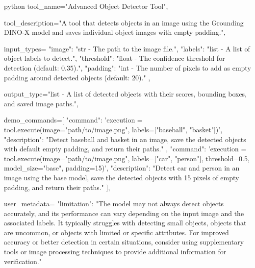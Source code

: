 \begin{codecolorbox}{python}
tool_name="Advanced Object Detector Tool",

tool_description="A tool that detects objects in an image using the Grounding DINO-X model and saves individual object images with empty padding.",

input_types={
    "image": "str - The path to the image file.",
    "labels": "list - A list of object labels to detect.",
    "threshold": "float - The confidence threshold for detection (default: 0.35).",
    "padding": "int - The number of pixels to add as empty padding around detected objects (default: 20)."
},

output_type="list - A list of detected objects with their scores, bounding boxes, and saved image paths.",

demo_commands=[
    {
        "command": 'execution = tool.execute(image="path/to/image.png", labels=["baseball", "basket"])',
        "description": "Detect baseball and basket in an image, save the detected objects with default empty padding, and return their paths."
    },
    {
        "command": 'execution = tool.execute(image="path/to/image.png", labels=["car", "person"], threshold=0.5, model_size="base", padding=15)',
        "description": "Detect car and person in an image using the base model, save the detected objects with 15 pixels of empty padding, and return their paths."
    }
],

user_metadata={
    "limitation": "The model may not always detect objects accurately, and its performance can vary depending on the input image and the associated labels. It typically struggles with detecting small objects, objects that are uncommon, or objects with limited or specific attributes. For improved accuracy or better detection in certain situations, consider using supplementary tools or image processing techniques to provide additional information for verification."
}
\end{codecolorbox}


